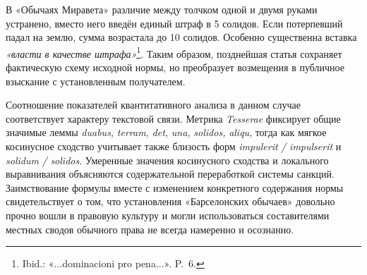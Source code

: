 В «Обычаях Миравета» различие между толчком одной и двумя руками устранено, вместо него введён единый штраф в 5 солидов. Если потерпевший падал на землю, сумма возрастала до 10 солидов. Особенно существенна вставка \emph{«}\emph{власти в качестве штрафа}\emph{»}\footnote{Ibid.: «...dominacioni pro pena...». P.~6.}. Таким образом, позднейшая статья сохраняет фактическую схему исходной нормы, но преобразует возмещения в публичное взыскание с установленным получателем.

Соотношение показателей квантитативного анализа в данном случае соответствует характеру текстовой связи. Метрика \emph{Tesserae} фиксирует общие значимые леммы \emph{duabus}\emph{, }\emph{terram}\emph{, }\emph{det}\emph{, }\emph{una}\emph{, }\emph{solidos}\emph{, }\emph{aliqu}, тогда как мягкое косинусное сходство учитывает также близость форм \emph{impulerit}\emph{ / }\emph{impulserit} и \emph{solidum}\emph{ / }\emph{solidos}. Умеренные значения косинусного сходства и локального выравнивания объясняются содержательной переработкой системы санкций. Заимствование формулы вместе с изменением конкретного содержания нормы свидетельствует о том, что установления «Барселонских обычаев» довольно прочно вошли в правовую культуру и могли использоваться составителями местных сводов обычного права не всегда намеренно и осознанно.

